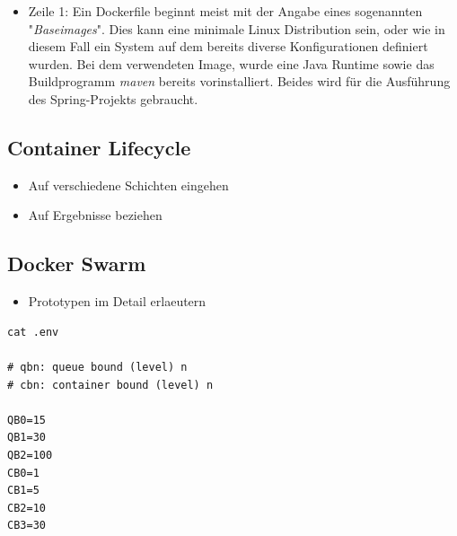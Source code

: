 \begin{itemize}
  \item Zeile 1: Ein Dockerfile beginnt meist mit der Angabe eines sogenannten "\emph{Baseimages}". Dies kann eine minimale Linux Distribution sein, oder wie in diesem Fall ein System auf dem bereits diverse Konfigurationen definiert wurden. Bei dem verwendeten Image, wurde eine Java Runtime sowie das Buildprogramm \emph{maven} bereits vorinstalliert. Beides wird für die Ausführung des Spring-Projekts gebraucht. 
\end{itemize}







\subsection{Container Lifecycle}
\begin{itemize}
  \item Auf verschiedene Schichten eingehen
  \item Auf Ergebnisse beziehen
\end{itemize}
\subsection{Docker Swarm}

\begin{itemize}
  \item Prototypen im Detail erlaeutern
\end{itemize}


\renewcommand\theadalign{bc}
\renewcommand\theadfont{\bfseries}
\renewcommand\theadgape{\Gape[4pt]}
\renewcommand\cellgape{\Gape[4pt]}


\begin{minipage}{\linewidth}
\begin{lstlisting}[style=bashStyle,caption={Node.js Projektstruktur},label=lst:nodeProjStruc]
cat .env

# qbn: queue bound (level) n
# cbn: container bound (level) n

QB0=15
QB1=30
QB2=100
CB0=1
CB1=5
CB2=10
CB3=30
\end{lstlisting}
\end{minipage}


